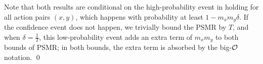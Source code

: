 Note that both results are conditional on the high-probability event in  holding for all action pairs $(x,y)$, which happens with probability at least $1-m_x m_y \delta$. If the confidence event does not happen, we trivially bound the PSMR by $T$, and when $\delta=\frac{1}{T}$, this low-probability event adds an extra term of $m_x m_y$ to both bounds of PSMR; in both bounds, the extra term is absorbed by the big-$\mathcal{O}$ notation. \qed
